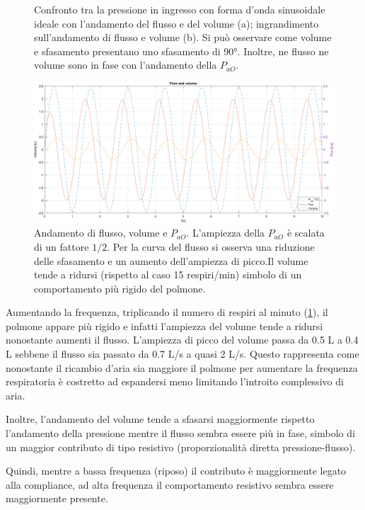 \begin{figure}[t!]
\begin{subfigure}{0.5\linewidth}
	\caption{}
\end{subfigure}
\caption{Confronto tra la pressione in ingresso con forma d'onda sinusoidale ideale con l'andamento del flusso e del volume (a); ingrandimento sull'andamento di flusso e volume (b). Si può osservare come volume e sfasamento presentano uno sfasamento di 90°. Inoltre, ne flusso ne volume sono in fase con l'andamento della $P_{aO}$. }
\label{fig:sine_wave_15}
	\centering
\includegraphics[width=0.95\linewidth]{../model/data_log/data_sine_wave_freq_45_zoom.pdf}
\caption{Andamento di flusso, volume e $P_{aO}$. L'ampiezza della $P_{aO}$ è scalata di un fattore $1/2$. Per la curva del flusso si osserva una riduzione delle sfasamento e un aumento dell'ampiezza di picco.Il volume tende a ridursi (rispetto al caso 15 respiri/min) simbolo di un comportamento più rigido del polmone.}
\label{fig:sine_wave_45}
\end{figure}

Aumentando la frequenza, triplicando il numero di respiri al minuto (\cref{fig:sine_wave_45}), il polmone appare più rigido e infatti l'ampiezza del volume tende a ridursi nonostante aumenti il flusso. L'ampiezza di picco del volume passa da 0.5 L a 0.4 L sebbene il flusso sia passato da 0.7 L/s a quasi 2 L/s. Questo rappresenta come nonostante il ricambio d'aria sia maggiore il polmone per aumentare la frequenza respiratoria è costretto ad espandersi meno limitando l'introito complessivo di aria.   

Inoltre, l'andamento del volume tende a sfasarsi maggiormente rispetto l'andamento della pressione mentre il flusso sembra essere più in fase, simbolo di un maggior contributo di tipo resistivo (proporzionalità diretta pressione-flusso).

Quindi, mentre a bassa frequenza (riposo) il contributo è maggiormente legato alla compliance, ad alta frequenza il comportamento resistivo sembra essere maggiormente presente.
\\

